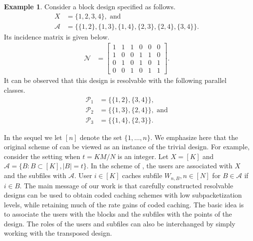 \documentclass[journal,twocolumn]{IEEEtran}
\theoremstyle{definition}
\newtheorem{example}{Example}
\newcommand{\calA}{\mathcal{A}}
\newcommand{\calN}{\mathcal{N}}
\newcommand{\calP}{\mathcal{P}}
\begin{document}
\begin{example}
\label{eg:resolv_6_2}
Consider a block design specified as follows.
\begin{align*}
X&=\{1,2,3,4\}, \text{~and}\\
\calA &=\{\{1,2\},\{1,3\},\{1,4\},\{2,3\},\{2,4\},\{3,4\}\}.
\end{align*}
Its incidence matrix is given below.
\begin{align*}
 \calN &= \begin{bmatrix}
 	1 & 1 & 1 & 0 & 0 & 0\\
 	1 & 0 & 0 & 1 & 1 & 0\\
 	0 & 1 & 0 & 1 & 0 & 1\\
 	0 & 0 & 1 & 0 & 1 & 1
\end{bmatrix}.
\end{align*}
It can be observed that this design is resolvable with the following parallel classes.
\begin{align*}
\calP_1 &= \{\{1,2\}, \{3,4\}\},\\
\calP_2 &= \{\{1,3\}, \{2,4\}\}, \text{~and}\\
\calP_3 &= \{\{1,4\}, \{2,3\}\}.
\end{align*}
\end{example}
In the sequel we let $[n]$ denote the set $\{1, \dots, n\}$.
We emphasize here that the original scheme of \cite{maddahN14} can be viewed as an instance of the trivial design. For example, consider the setting when $t = KM/N$ is an integer. Let  $X = [K]$ and $\calA = \{B: B \subset [K], |B| = t\}$. In the scheme of \cite{maddahN14}, the users are associated with $X$ and the subfiles with $\calA$. User $i \in [K]$ caches subfile $W_{n,B}, n \in [N]$ for $B \in \calA$ if $i \in B$. %
The main message of our work is that carefully constructed resolvable designs can be used to obtain coded caching schemes with low subpacketization levels, while retaining much of the rate gains of coded caching. The basic idea is to associate the users with the blocks and the subfiles with the points of the design. The roles of the users and subfiles can also be interchanged by simply working with the transposed design.
\end{document}
